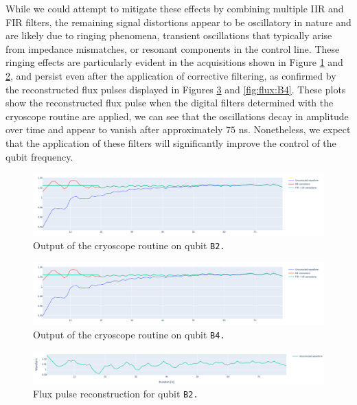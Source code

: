 While we could attempt to mitigate these effects by combining multiple IIR and FIR filters, the remaining signal distortions appear to be oscillatory in nature and are likely due to ringing phenomena, transient oscillations that typically arise from impedance mismatches, or resonant components in the control line.
These ringing effects are particularly evident in the acquisitions shown in Figure \ref{fig:cryoscope:B2} and \ref{fig:cryoscope:B4}, and persist even after the application of corrective filtering, as confirmed by the reconstructed flux pulses displayed in Figures \ref{fig:flux:B2} and \ref{fig:flux:B4}.
These plots show the reconstructed flux pulse when the digital filters determined with the cryoscope routine are applied, we can see that the oscillations decay in amplitude over time and appear to vanish after approximately $75$ ns. 
Nonetheless, we expect that the application of these filters will significantly improve the control of the qubit frequency.

\begin{figure}[h!]
    \centering
    \includegraphics[width=\textwidth]{figures/png/Cryoscope/B2_ringing.png}
    \caption{Output of the cryoscope routine on qubit \tt{B2}.}
    \label{fig:cryoscope:B2}
\end{figure}

\begin{figure}[h!]
    \centering
    \includegraphics[width=\textwidth]{figures/png/Cryoscope/B2_ringing.png}
    \caption{Output of the cryoscope routine on qubit \tt{B4}.}
    \label{fig:cryoscope:B4}
\end{figure} 

\begin{figure}[h!]
    \centering
    \includegraphics[width=\textwidth]{figures/png/Cryoscope/flux_B2.png}
    \caption{Flux pulse reconstruction for qubit \tt{B2}.}
    \label{fig:flux:B2}
\end{figure}

